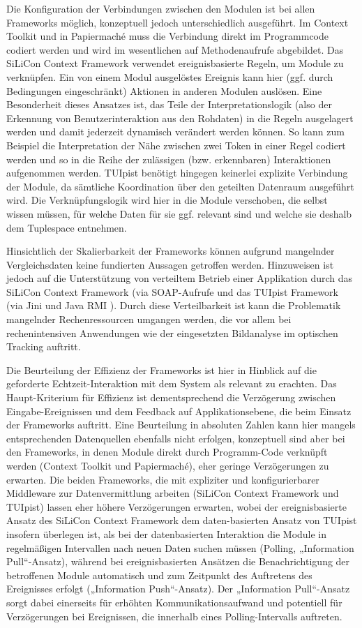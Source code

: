 Die Konfiguration der Verbindungen zwischen den Modulen ist bei allen Frameworks möglich, konzeptuell jedoch unterschiedlich ausgeführt. Im Context Toolkit und in Papiermaché muss die Verbindung direkt im Programmcode codiert werden und wird im wesentlichen auf Methodenaufrufe abgebildet. Das SiLiCon Context Framework verwendet ereignisbasierte Regeln, um Module zu verknüpfen. Ein von einem Modul ausgelöstes Ereignis kann hier (ggf. durch Bedingungen eingeschränkt) Aktionen in anderen Modulen auslösen. Eine Besonderheit dieses Ansatzes ist, das Teile der Interpretationslogik (also der Erkennung von Benutzerinteraktion aus den Rohdaten) in die Regeln ausgelagert werden und damit jederzeit dynamisch verändert werden können. So kann zum Beispiel die Interpretation der Nähe zwischen zwei Token in einer Regel codiert werden und so in die Reihe der zulässigen (bzw. erkennbaren) Interaktionen aufgenommen werden. TUIpist benötigt hingegen keinerlei explizite Verbindung der Module, da sämtliche Koordination über den geteilten Datenraum ausgeführt wird. Die Verknüpfungslogik wird hier in die Module verschoben, die selbst wissen müssen, für welche Daten für sie ggf. relevant sind und welche sie deshalb dem Tuplespace entnehmen.

Hinsichtlich der Skalierbarkeit der Frameworks können aufgrund mangelnder Vergleichsdaten keine fundierten Aussagen getroffen werden. Hinzuweisen ist jedoch auf die Unterstützung von verteiltem Betrieb einer Applikation durch das SiLiCon Context Framework (via SOAP-Aufrufe \citep{Curbera02} und das TUIpist Framework (via Jini und Java \gls{RMI} \citep{Downing98}). Durch diese Verteilbarkeit ist kann die Problematik mangelnder Rechenressourcen umgangen werden, die vor allem bei rechenintensiven Anwendungen wie der eingesetzten Bildanalyse im optischen Tracking auftritt.

Die Beurteilung der Effizienz der Frameworks ist hier in Hinblick auf die geforderte Echtzeit-Interaktion mit dem System als relevant zu erachten. Das Haupt-Kriterium für Effizienz ist dementsprechend die Verzögerung zwischen Eingabe-Ereignissen und dem Feedback auf Applikationsebene, die beim Einsatz der Frameworks auftritt. Eine Beurteilung in absoluten Zahlen kann hier mangels entsprechenden Datenquellen ebenfalls nicht erfolgen, konzeptuell sind aber bei den Frameworks, in denen Module direkt durch Programm-Code verknüpft werden (Context Toolkit und Papiermaché), eher geringe Verzögerungen zu erwarten. Die beiden Frameworks, die mit expliziter und konfigurierbarer Middleware zur Datenvermittlung arbeiten (SiLiCon Context Framework und TUIpist) lassen eher höhere Verzögerungen erwarten, wobei der ereignisbasierte Ansatz des SiLiCon Context Framework dem daten-basierten Ansatz von TUIpist insofern überlegen ist, als bei der datenbasierten Interaktion die Module in regelmäßigen Intervallen nach neuen Daten suchen müssen (Polling, „Information Pull“-Ansatz), während bei ereignisbasierten Ansätzen die Benachrichtigung der betroffenen Module automatisch und zum Zeitpunkt des Auftretens des Ereignisses erfolgt („Information Push“-Ansatz). Der „Information Pull“-Ansatz sorgt dabei einerseits für erhöhten Kommunikationsaufwand und potentiell für Verzögerungen bei Ereignissen, die innerhalb eines Polling-Intervalls auftreten.

